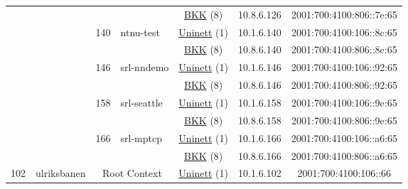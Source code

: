 \begin{small}
\begin{center}
\begin{longtable}{|c|c|c|c|c|c|c|c|}
  &  &  &  & \multicolumn{2}{|c|}{\tiny{\href{http://bkk.no}{BKK} (8)}} & \tiny{10.8.6.126} & \tiny{2001:700:4100:806::7e:65} \\* \cline{3-3}\cline{4-4}\cline{5-5}\cline{6-6}\cline{7-7}\cline{8-8}
  &  & \multirow{2}{*}{\tiny{140}} & \multicolumn{1}{|l|}{\multirow{2}{*}{\tiny{ntnu-test}}} & \multicolumn{2}{|c|}{\tiny{\href{https://www.uninett.no}{Uninett} (1)}} & \tiny{10.1.6.140} & \tiny{2001:700:4100:106::8c:65} \\* \cline{5-5}\cline{6-6}\cline{7-7}\cline{8-8}
  &  &  &  & \multicolumn{2}{|c|}{\tiny{\href{http://bkk.no}{BKK} (8)}} & \tiny{10.8.6.140} & \tiny{2001:700:4100:806::8c:65} \\* \cline{3-3}\cline{4-4}\cline{5-5}\cline{6-6}\cline{7-7}\cline{8-8}
  &  & \multirow{2}{*}{\tiny{146}} & \multicolumn{1}{|l|}{\multirow{2}{*}{\tiny{srl-nndemo}}} & \multicolumn{2}{|c|}{\tiny{\href{https://www.uninett.no}{Uninett} (1)}} & \tiny{10.1.6.146} & \tiny{2001:700:4100:106::92:65} \\* \cline{5-5}\cline{6-6}\cline{7-7}\cline{8-8}
  &  &  &  & \multicolumn{2}{|c|}{\tiny{\href{http://bkk.no}{BKK} (8)}} & \tiny{10.8.6.146} & \tiny{2001:700:4100:806::92:65} \\* \cline{3-3}\cline{4-4}\cline{5-5}\cline{6-6}\cline{7-7}\cline{8-8}
  &  & \multirow{2}{*}{\tiny{158}} & \multicolumn{1}{|l|}{\multirow{2}{*}{\tiny{srl-seattle}}} & \multicolumn{2}{|c|}{\tiny{\href{https://www.uninett.no}{Uninett} (1)}} & \tiny{10.1.6.158} & \tiny{2001:700:4100:106::9e:65} \\* \cline{5-5}\cline{6-6}\cline{7-7}\cline{8-8}
  &  &  &  & \multicolumn{2}{|c|}{\tiny{\href{http://bkk.no}{BKK} (8)}} & \tiny{10.8.6.158} & \tiny{2001:700:4100:806::9e:65} \\* \cline{3-3}\cline{4-4}\cline{5-5}\cline{6-6}\cline{7-7}\cline{8-8}
  &  & \multirow{2}{*}{\tiny{166}} & \multicolumn{1}{|l|}{\multirow{2}{*}{\tiny{srl-mptcp}}} & \multicolumn{2}{|c|}{\tiny{\href{https://www.uninett.no}{Uninett} (1)}} & \tiny{10.1.6.166} & \tiny{2001:700:4100:106::a6:65} \\* \cline{5-5}\cline{6-6}\cline{7-7}\cline{8-8}
  &  &  &  & \multicolumn{2}{|c|}{\tiny{\href{http://bkk.no}{BKK} (8)}} & \tiny{10.8.6.166} & \tiny{2001:700:4100:806::a6:65} \\ \hline
 \multirow{14}{*}{\tiny{102}} & \multicolumn{1}{|l|}{\multirow{14}{*}{\tiny{ulriksbanen}}} & \multicolumn{2}{|c|}{\multirow{2}{*}{\tiny{Root Context}}} & \multicolumn{2}{|c|}{\tiny{\href{https://www.uninett.no}{Uninett} (1)}} & \tiny{10.1.6.102} & \tiny{2001:700:4100:106::66} \\* \cline{5-5}\cline{6-6}\cline{7-7}\cline{8-8}

\end{longtable}
\end{center}
\end{small}
